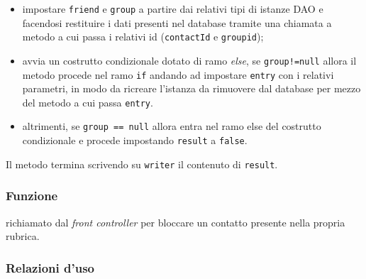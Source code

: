 \begin{description}
\begin{itemize}
\begin{itemize}
			
			\item impostare \texttt{friend} e \texttt{group} a partire dai relativi tipi di istanze DAO e facendosi restituire i dati presenti nel database tramite una chiamata a metodo  a cui passa i relativi id (\texttt{contactId} e \texttt{groupid});
			\item avvia un costrutto condizionale dotato di ramo \textit{else}, se \texttt{group!=null} allora il metodo procede nel ramo \texttt{if} andando ad impostare \texttt{entry} con i relativi parametri, in modo da ricreare l'istanza  da rimuovere dal database per mezzo del metodo  a cui passa \texttt{entry}. 
			\item altrimenti, se \texttt{group == null} allora entra nel ramo else del costrutto condizionale e procede impostando \texttt{result} a \texttt{false}.
		\end{itemize}
	\end{itemize}
	Il metodo termina scrivendo su \texttt{writer} il contenuto di \texttt{result}.
	
\end{description}



\subsubsection*{Funzione}
 richiamato dal \textit{front controller} per bloccare un contatto presente nella propria rubrica.

\subsubsection*{Relazioni d'uso}

